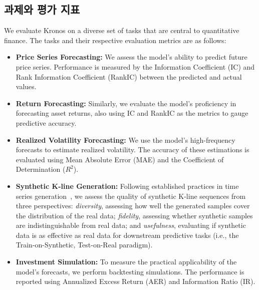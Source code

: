 \subsection{과제와 평가 지표}
We evaluate Kronos on a diverse set of tasks that are central to quantitative finance. The tasks and their respective evaluation metrics are as follows:
\begin{itemize}
    \item \textbf{Price Series Forecasting:} We assess the model's ability to predict future price series. Performance is measured by the Information Coefficient (IC) and Rank Information Coefficient (RankIC) between the predicted and actual values.
    \item \textbf{Return Forecasting:} Similarly, we evaluate the model's proficiency in forecasting asset returns, also using IC and RankIC as the metrics to gauge predictive accuracy.
    \item \textbf{Realized Volatility Forecasting:} We use the model's high-frequency forecasts to estimate realized volatility. The accuracy of these estimations is evaluated using Mean Absolute Error (MAE) and the Coefficient of Determination ($R^2$).
    \item \textbf{Synthetic K-line Generation:} Following established practices in time series generation~\cite{yoon2019time}, we assess the quality of synthetic K-line sequences from three perspectives: \textit{diversity}, assessing how well the generated samples cover the distribution of the real data; \textit{fidelity}, assessing whether synthetic samples are indistinguishable from real data; and \textit{usefulness}, evaluating if synthetic data is as effective as real data for downstream predictive tasks (i.e., the Train-on-Synthetic, Test-on-Real paradigm).
    \item \textbf{Investment Simulation:} To measure the practical applicability of the model's forecasts, we perform backtesting simulations. The performance is reported using Annualized Excess Return (AER) and Information Ratio (IR).
\end{itemize}


